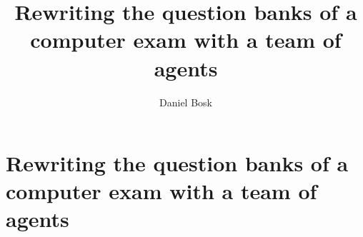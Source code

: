 \documentclass[a4paper,10pt,oneside,openright,
               oldfontcommands]{memoir}
\begin{document}
\title{%
  Rewriting the question banks of a computer exam with a team of agents
}
\author{Daniel Bosk}

\maketitle

\begin{abstract}
  
\end{abstract}

\clearpage

\tableofcontents*

\chapter[Rewriting the question banks]{Rewriting the question banks of a
  computer exam with a team of agents}



\appendix


\printbibliography
\end{document}
